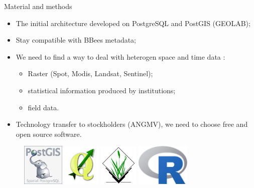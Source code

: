 \documentclass[newPxFont]{beamer}
\begin{document}

\begin{frame}[c]{Material and methods}
\vspace{-1cm}
\begin{itemize}
	\item The initial architecture developed on PostgreSQL and PostGIS (GEOLAB);
	\item Stay compatible with BBees metadata;
	\item We need to find a way to deal with heterogen space and time data :
	\begin{itemize}
		\item Raster (Spot, Modis, Landsat, Sentinel);
		\item statistical information produced by institutions;
		\item field data.
	\end{itemize}
	\item Technology transfer to stockholders (ANGMV), we need to choose free and open source software.
\end{itemize}
\begin{figure}
	\centering
	\includegraphics[height=20mm]{img/PostGIS_logo}
	\includegraphics[height=20mm]{img/QGis_Logo}
	\includegraphics[height=20mm]{img/GrassGIS_banner}
	\includegraphics[height=20mm]{img/Rlogo}
\end{figure}
\end{frame}
\end{document}
